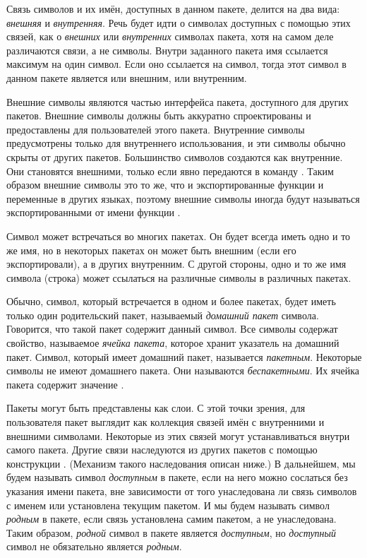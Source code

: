 Связь символов и их имён, доступных в данном пакете, делится на два
вида: \emph{внешняя} и \emph{внутренняя}. Речь будет идти о символах
доступных с помощью этих связей, как о \emph{внешних} или
\emph{внутренних} символах пакета, хотя на самом деле различаются
связи, а не символы. Внутри заданного пакета имя ссылается максимум
на один символ. Если оно ссылается на символ, тогда этот символ в
данном пакете является или внешним, или внутренним.

Внешние символы являются частью интерфейса пакета, доступного для
других пакетов. Внешние символы должны быть аккуратно спроектированы и
предоставлены для пользователей этого пакета. Внутренние символы
предусмотрены только для внутреннего использования, и эти символы
обычно скрыты от других пакетов. Большинство символов создаются как
внутренние. Они становятся внешними, только если явно передаются в
команду . Таким образом внешние символы это то же, что и
экспортированные функции и переменные в других языках, поэтому внешние
символы иногда будут называться экспортированными от имени функции
.

Символ может встречаться во многих пакетах. Он будет всегда иметь одно
и то же имя, но в некоторых пакетах он может быть внешним (если его
экспортировали), а в других внутренним. С другой стороны, одно и то же
имя символа (строка) может ссылаться на различные символы в различных
пакетах.

Обычно, символ, который встречается в одном и более пакетах, будет иметь только
один родительский пакет, называемый \emph{домашний пакет} символа. Говорится,
что такой пакет содержит данный символ.
Все символы содержат свойство, называемое \emph{ячейка пакета}, которое хранит
указатель на домашний пакет.
Символ, который имеет домашний пакет, называется \emph{пакетным}.
Некоторые символы не имеют домашнего пакета. Они называются
\emph{беспакетными}. Их ячейка пакета содержит значение {\false}.

Пакеты могут быть представлены как слои. С этой точки зрения, для пользователя
пакет выглядит как коллекция связей имён с внутренними и внешними
символами. Некоторые из этих связей могут устанавливаться внутри
самого пакета. Другие связи наследуются из других пакетов с
помощью конструкции . (Механизм такого наследования описан
ниже.) В дальнейшем, мы будем называть символ \emph{доступным} в пакете, если
на него можно сослаться без указания имени пакета, вне зависимости от
того унаследована ли связь символов с именем или установлена текущим пакетом. И
мы будем называть символ \emph{родным} в пакете, если связь установлена
самим пакетом, а не унаследована. Таким образом, \emph{родной} символ в пакете
является \emph{доступным}, но \emph{доступный} символ не обязательно является
\emph{родным}.

